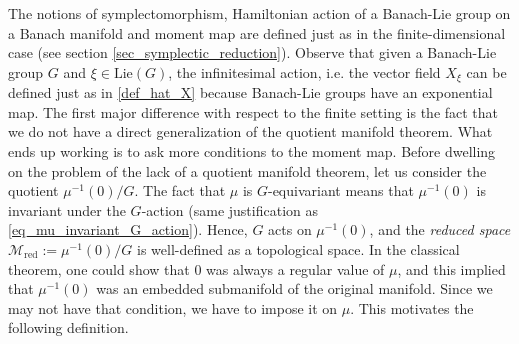 The notions of symplectomorphism, Hamiltonian action of a Banach-Lie group on a Banach manifold and moment map are defined just as in the finite-dimensional case (see section \ref{sec_symplectic_reduction}). Observe that given a Banach-Lie group \(G\) and \(\xi \in \mathrm{Lie}(G)\), the infinitesimal action, i.e. the vector field \(X_{\xi}\) can be defined just as in \eqref{def_hat_X} because Banach-Lie groups have an exponential map. The first major difference with respect to the finite setting is the fact that we do not have a direct generalization of the quotient manifold theorem. What ends up working is to ask more conditions to the moment map. Before dwelling on the problem of the lack of a quotient manifold theorem, let us consider the quotient \(\mu^{-1}(0)/G\). The fact that \(\mu\) is \(G\)-equivariant means that \(\mu^{-1}(0)\) is invariant under the \(G\)-action (same justification as \eqref{eq_mu_invariant_G_action}). Hence, \(G\) acts on \(\mu^{-1}(0)\), and the \textit{reduced space} \(\mathcal{M}_{\mathrm{red}}:=\mu^{-1}(0)/G\) is well-defined as a topological space. In the classical theorem, one could show that \(0\) was always a regular value of \(\mu\), and this implied that \(\mu^{-1}(0)\) was an embedded submanifold of the original manifold. Since we may not have that condition, we have to impose it on \(\mu\). This motivates the following definition.

